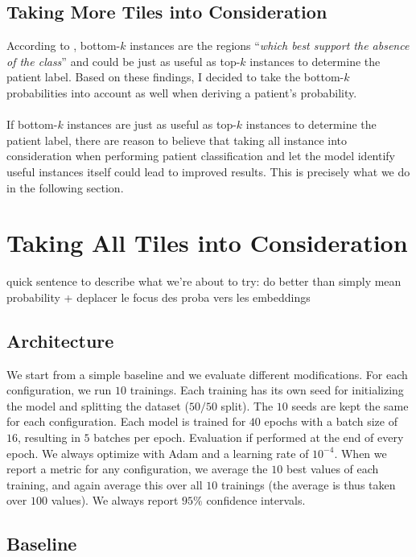 \documentclass[final]{cvpr}
\begin{document}
	\subsection{Taking More Tiles into Consideration}
	
	According to \cite{owkin}, bottom-$k$ instances are the regions “\textit{which best support the absence of the class}” and could be just as useful as top-$k$ instances to determine the patient label. Based on these findings, I decided to take the bottom-$k$ probabilities into account as well when deriving a patient's probability.\\
	\\
	If bottom-$k$ instances are just as useful as top-$k$ instances to determine the patient label, there are reason to believe that taking all instance into consideration when performing patient classification and let the model identify useful instances itself could lead to improved results. This is precisely what we do in the following section.
	
	\section{Taking All Tiles into Consideration}
	
	quick sentence to describe what we're about to try: do better than simply mean probability + deplacer le focus des proba vers les embeddings
	
	\subsection{Architecture}
	
	We start from a simple baseline and we evaluate different modifications.
	For each configuration, we run $10$ trainings. Each training has its own seed for initializing the model and splitting the dataset ($50/50$ split). The $10$ seeds are kept the same for each configuration. Each model is trained for $40$ epochs with a batch size of $16$, resulting in $5$ batches per epoch. Evaluation if performed at the end of every epoch. We always optimize with Adam and a learning rate of $10^{-4}$. When we report a metric for any configuration, we average the $10$ best values of each training, and again average this over all $10$ trainings (the average is thus taken over $100$ values). We always report $95\%$ confidence intervals.
	
	\subsection{Baseline}
	
\end{document}
